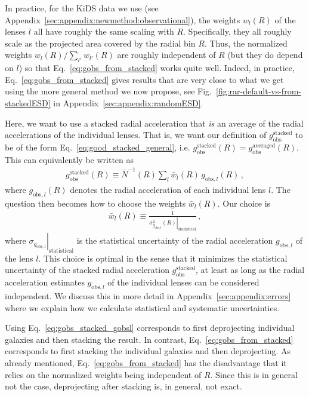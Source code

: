 \documentclass[a4paper,11pt]{article}
\begin{document}
In practice, for the KiDS data we use (see Appendix~\ref{sec:appendix:newmethod:observational}), the weights $w_l(R)$ of the lenses $l$ all have roughly the same scaling with $R$.
Specifically, they all roughly scale as the projected area covered by the radial bin $R$.
Thus, the normalized weights $w_l(R) / \sum_{l'} w_{l'}(R)$ are roughly independent of $R$ (but they do depend on $l$) so that Eq.~\eqref{eq:gobs_from_stacked} works quite well.
Indeed, in practice, Eq.~\eqref{eq:gobs_from_stacked} gives results that are very close to what we get using the more general method we now propose, see Fig.~\ref{fig:rar-default-vs-from-stackedESD} in Appendix~\ref{sec:appendix:randomESD}.

Here, we want to use a stacked radial acceleration that \emph{is} an average of the radial accelerations of the individual lenses.
That is, we want our definition of $g_{\mathrm{obs}}^{\mathrm{stacked}}$ to be of the form Eq.~\eqref{eq:good_stacked_general}, i.e. $g_{\mathrm{obs}}^{\mathrm{stacked}}(R) = g_{\mathrm{obs}}^{\mathrm{averaged}}(R)$.
This can equivalently be written as
\begin{align}
 \label{eq:gobs_stacked_gobsl}
 g_{\mathrm{obs}}^{\mathrm{stacked}}(R) \equiv \bar{N}^{-1}(R) \sum_l \bar{w}_l(R) \, g_{\mathrm{obs},l}(R)\,,
\end{align}
where $g_{\mathrm{obs},l}(R)$ denotes the radial acceleration of each individual lens $l$.
The question then becomes how to choose the weights $\bar{w}_l(R)$.
Our choice is
\begin{align}
 \label{eq:gobs_weights}
 \bar{w}_l(R) \equiv \frac{1}{\left. \sigma_{g_{\mathrm{obs},l}}^2(R) \right|_{\mathrm{statistical}}}\,,
\end{align}
where $\left.\sigma_{g_{\mathrm{obs},l}}\right|_{\mathrm{statistical}}$ is the statistical uncertainty of the radial acceleration $g_{\mathrm{obs},l}$ of the lens $l$.
This choice is optimal in the sense that it minimizes the statistical uncertainty of the stacked radial acceleration $g_{\mathrm{obs}}^{\mathrm{stacked}}$, at least as long as the radial acceleration estimates $g_{\mathrm{obs},l}$ of the individual lenses can be considered independent.
We discuss this in more detail in Appendix~\ref{sec:appendix:errors} where we explain how we calculate statistical and systematic uncertainties.

Using  Eq.~\eqref{eq:gobs_stacked_gobsl} corresponds to first deprojecting individual galaxies and then stacking the result.
In contrast, Eq.~\eqref{eq:gobs_from_stacked} corresponds to first stacking the individual galaxies and then deprojecting.
As already mentioned, Eq.~\eqref{eq:gobs_from_stacked} has the disadvantage that it relies on the normalized weights being independent of $R$.
Since this is in general not the case, deprojecting after stacking is, in general, not exact.
\end{document}
